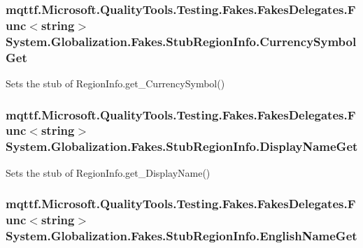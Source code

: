 \hypertarget{class_system_1_1_globalization_1_1_fakes_1_1_stub_region_info_aec277298a0c9dd139a9b77e2b1cd60ef}{
\subsubsection[{Currency\-Symbol\-Get}]{\setlength{\rightskip}{0pt plus 5cm}mqttf.\-Microsoft.\-Quality\-Tools.\-Testing.\-Fakes.\-Fakes\-Delegates.\-Func$<$string$>$ System.\-Globalization.\-Fakes.\-Stub\-Region\-Info.\-Currency\-Symbol\-Get}}\label{class_system_1_1_globalization_1_1_fakes_1_1_stub_region_info_aec277298a0c9dd139a9b77e2b1cd60ef}


Sets the stub of Region\-Info.\-get\-\_\-\-Currency\-Symbol()

\hypertarget{class_system_1_1_globalization_1_1_fakes_1_1_stub_region_info_a390c36a4c1324f08f226521401fcaa7d}{
\subsubsection[{Display\-Name\-Get}]{\setlength{\rightskip}{0pt plus 5cm}mqttf.\-Microsoft.\-Quality\-Tools.\-Testing.\-Fakes.\-Fakes\-Delegates.\-Func$<$string$>$ System.\-Globalization.\-Fakes.\-Stub\-Region\-Info.\-Display\-Name\-Get}}\label{class_system_1_1_globalization_1_1_fakes_1_1_stub_region_info_a390c36a4c1324f08f226521401fcaa7d}


Sets the stub of Region\-Info.\-get\-\_\-\-Display\-Name()

\hypertarget{class_system_1_1_globalization_1_1_fakes_1_1_stub_region_info_af0fc3198f8d182d2346e49431862ab09}{
\subsubsection[{English\-Name\-Get}]{\setlength{\rightskip}{0pt plus 5cm}mqttf.\-Microsoft.\-Quality\-Tools.\-Testing.\-Fakes.\-Fakes\-Delegates.\-Func$<$string$>$ System.\-Globalization.\-Fakes.\-Stub\-Region\-Info.\-English\-Name\-Get}}\label{class_system_1_1_globalization_1_1_fakes_1_1_stub_region_info_af0fc3198f8d182d2346e49431862ab09}


